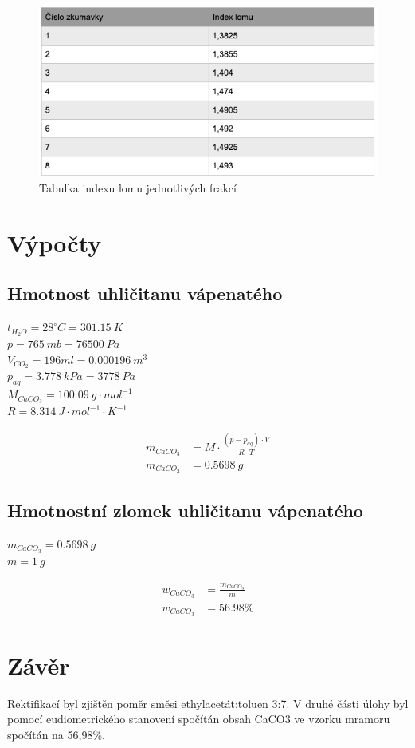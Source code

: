 \documentclass[13pt, a4paper, twoside]{article}
\begin{document}
\begin{figure}[H]
    \centering
    \includegraphics[width=6.5in]{uloha_8_tab_3.png}
    \caption*{Tabulka indexu lomu jednotlivých frakcí}
\end{figure}



\section*{Výpočty}
\subsection*{Hmotnost uhličitanu vápenatého}
$t_{H_2O}=28^{\circ}C = 301.15\: K$\\
$p = 765\: mb = 76500\:Pa$\\
$V_{CO_2}=196ml = 0.000196\:m^3$\\
$p_{aq}=3.778\:kPa=3778\:Pa$\\
$M_{CaCO_3} = 100.09 \: g\cdot mol^{-1}$\\
$R = 8.314\: J\cdot mol^{-1}\cdot K^{-1}$

\begin{align*}
    m_{CaCO_3} &= M\cdot\frac{(p-p_{aq})\cdot V}{R\cdot T}\\
    m_{CaCO_3} &= 0.5698 \: g
\end{align*}

\subsection*{Hmotnostní zlomek uhličitanu vápenatého}
$m_{CaCO_3}=0.5698\:g$\\
$m = 1\: g$

\begin{align*}
    w_{CaCO_3} &= \frac{m_{CaCO_3}}{m}\\
    w_{CaCO_3} &= 56.98\%
\end{align*}

\section*{Závěr}
Rektifikací byl zjištěn poměr směsi ethylacetát:toluen 3:7. V druhé části úlohy byl pomocí eudiometrického stanovení spočítán obsah CaCO3 ve vzorku mramoru spočítán na 56,98\%.
\end{document}
